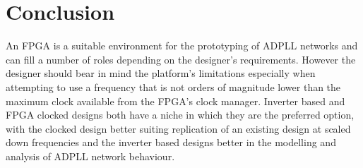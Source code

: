 \documentclass[conference]{IEEEtran}
\begin{document}
\section*{Conclusion}
An FPGA is a suitable environment for the prototyping of ADPLL networks and can fill a number of roles depending on the designer's requirements. However the designer should bear in mind the platform's limitations especially when attempting to use a frequency that is not orders of magnitude lower than the maximum clock available from the FPGA's clock manager. Inverter based and FPGA clocked designs both have a niche in which they are the preferred option, with the clocked design better suiting replication of an existing design at scaled down frequencies and the inverter based designs better in the modelling and analysis of ADPLL network behaviour.


 
\end{document}
